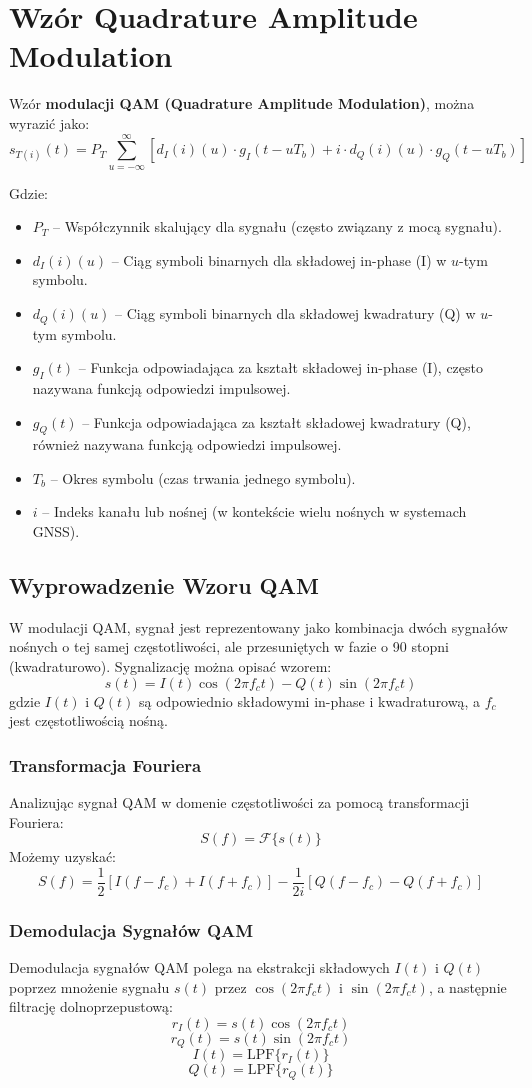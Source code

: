 \section{Wzór Quadrature Amplitude Modulation}
Wzór \textbf{modulacji QAM (Quadrature Amplitude Modulation)}, można wyrazić jako:
\[
s_{T(i)}(t) = P_{T} \sum_{u=-\infty}^{\infty} \left[ d_I(i)(u) \cdot g_I(t - uT_b) + i \cdot d_Q(i)(u) \cdot g_Q(t - uT_b) \right]
\]

Gdzie:
\begin{itemize}
    \item \( P_{T} \) – Współczynnik skalujący dla sygnału (często związany z mocą sygnału).
    \item \( d_I(i)(u) \) – Ciąg symboli binarnych dla składowej in-phase (I) w \( u \)-tym symbolu.
    \item \( d_Q(i)(u) \) – Ciąg symboli binarnych dla składowej kwadratury (Q) w \( u \)-tym symbolu.
    \item \( g_I(t) \) – Funkcja odpowiadająca za kształt składowej in-phase (I), często nazywana funkcją odpowiedzi impulsowej.
    \item \( g_Q(t) \) – Funkcja odpowiadająca za kształt składowej kwadratury (Q), również nazywana funkcją odpowiedzi impulsowej.
    \item \( T_b \) – Okres symbolu (czas trwania jednego symbolu).
    \item \( i \) – Indeks kanału lub nośnej (w kontekście wielu nośnych w systemach GNSS).
\end{itemize}

\subsection{Wyprowadzenie Wzoru QAM}
W modulacji QAM, sygnał jest reprezentowany jako kombinacja dwóch sygnałów nośnych o tej samej częstotliwości, ale przesuniętych w fazie o 90 stopni (kwadraturowo). Sygnalizację można opisać wzorem:
\[
s(t) = I(t) \cos(2 \pi f_c t) - Q(t) \sin(2 \pi f_c t)
\]
gdzie \( I(t) \) i \( Q(t) \) są odpowiednio składowymi in-phase i kwadraturową, a \( f_c \) jest częstotliwością nośną.

\subsubsection{Transformacja Fouriera}
Analizując sygnał QAM w domenie częstotliwości za pomocą transformacji Fouriera:
\[
S(f) = \mathcal{F}\{s(t)\}
\]
Możemy uzyskać:
\[
S(f) = \frac{1}{2} \left[ I(f - f_c) + I(f + f_c) \right] - \frac{1}{2i} \left[ Q(f - f_c) - Q(f + f_c) \right]
\]

\subsubsection{Demodulacja Sygnałów QAM}
Demodulacja sygnałów QAM polega na ekstrakcji składowych \( I(t) \) i \( Q(t) \) poprzez mnożenie sygnału \( s(t) \) przez \( \cos(2 \pi f_c t) \) i \( \sin(2 \pi f_c t) \), a następnie filtrację dolnoprzepustową:
\[
r_I(t) = s(t) \cos(2 \pi f_c t)
\]
\[
r_Q(t) = s(t) \sin(2 \pi f_c t)
\]
\[
I(t) = \text{LPF}\{ r_I(t) \}
\]
\[
Q(t) = \text{LPF}\{ r_Q(t) \}
\]
